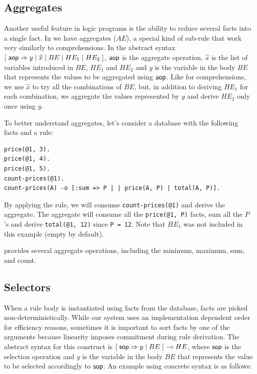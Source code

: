 \subsection{Aggregates}

Another useful feature in logic programs is the ability to reduce several facts into a single fact.
In \lang we have aggregates ($AE$), a special kind of sub-rule that work very similarly to comprehensions.
In the abstract syntax $[\;\mathsf{aop} \Rightarrow y \; | \; \widehat{x} \; | \; BE \; | \; HE_1 \; |
\; HE_2 \;]$, $\mathsf{aop}$ is the aggregate operation, $\widehat{x}$ is the list of variables
introduced in $BE$, $HE_1$ and $HE_2$ and $y$ is the variable in the body
$BE$ that represents the values to be aggregated using $\mathsf{aop}$. Like for comprehensions,
we use $\widehat{x}$ to try all the combinations of $BE$, but, in addition to deriving $HE_1$ for each combination,
we aggregate the values represented by $y$ and derive $HE_2$ only once using $y$.

To better understand aggregates, let's consider a database with the following facts and a rule:

\begin{Verbatim}
price(@1, 3).
price(@1, 4).
price(@1, 5).
count-prices(@1).
count-prices(A) -o [:sum => P | | price(A, P) | total(A, P)].
\end{Verbatim}

By applying the rule, we will consume \texttt{count-prices(@1)} and
derive the aggregate. The aggregate will consume all the \texttt{price(@1, P)} facts,
sum all the $P$'s and derive \texttt{total(@1,~12)} since \texttt{P~=~12}.
Note that $HE_1$ was not included in this example (empty by default).

\lang provides several aggregate operations, including the minimum, maximum, sum, and count.

\subsection{Selectors}

When a rule body is instantiated using facts from the database, facts are picked
non-deterministically. While our system uses an implementation dependent order for
efficiency reasons, sometimes it is important to sort facts by one of the arguments
because linearity imposes commitment during rule derivation. The abstract syntax for
this construct is $[\; \mathsf{sop} \Rightarrow y \; | \; BE \;] \multimap HE$, where
$\mathsf{sop}$ is the selection operation and $y$ is the variable in the body $BE$ that
represents the value to be selected accordingly to $\mathsf{sop}$.
An example using concrete syntax is as follows:

